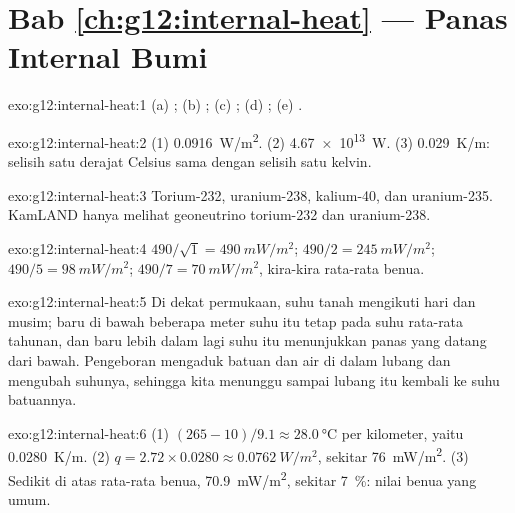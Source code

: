 \section*{Bab \ref{ch:g12:internal-heat} --- Panas Internal Bumi}

\begin{solution}{exo:g12:internal-heat:1}
(a) ; (b) ; (c) ;
(d) ; (e) .
\end{solution}

\begin{solution}{exo:g12:internal-heat:2}
(1) \qty{0.0916}{W/m^2}. (2) \qty{4.67e13}{W}. (3) \qty{0.029}{K/m}: selisih
satu derajat Celsius sama dengan selisih satu kelvin.
\end{solution}

\begin{solution}{exo:g12:internal-heat:3}
Torium-232, uranium-238, kalium-40, dan uranium-235. KamLAND hanya melihat
geoneutrino torium-232 dan uranium-238.
\end{solution}

\begin{solution}{exo:g12:internal-heat:4}
$490/\sqrt{1} = \qty{490}{mW/m^2}$; $490/2 = \qty{245}{mW/m^2}$;
$490/5 = \qty{98}{mW/m^2}$; $490/7 = \qty{70}{mW/m^2}$, kira-kira rata-rata
benua.
\end{solution}

\begin{solution}{exo:g12:internal-heat:5}
Di dekat permukaan, suhu tanah mengikuti hari dan musim; baru di bawah
beberapa meter suhu itu tetap pada suhu rata-rata tahunan, dan baru lebih dalam
lagi suhu itu menunjukkan panas yang datang dari bawah. Pengeboran mengaduk
batuan dan air di dalam lubang dan mengubah suhunya, sehingga kita menunggu
sampai lubang itu kembali ke suhu batuannya.
\end{solution}

\begin{solution}{exo:g12:internal-heat:6}
(1) $(265 - 10)/9.1 \approx \qty{28.0}{\celsius}$ per kilometer, yaitu
\qty{0.0280}{K/m}. (2) $q = 2.72 \times 0.0280 \approx \qty{0.0762}{W/m^2}$,
sekitar \qty{76}{mW/m^2}. (3) Sedikit di atas rata-rata benua,
\qty{70.9}{mW/m^2}, sekitar \qty{7}{\percent}: nilai benua yang umum.
\end{solution}


